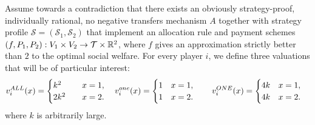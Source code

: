 Assume towards a contradiction that 
there exists an obviously strategy-proof, individually rational, no negative transfers mechanism $A$ together with strategy profile $\mathcal S=(\mathcal S_1,\mathcal S_2)$
that implement an allocation rule and payment schemes  $(f,P_1,P_2):V_1\times V_2\to \mathcal{T}\times \mathbb R^2$, where $f$ 
gives an approximation strictly better than $2$ to the optimal social welfare.  
For every player $i$, we define three valuations that will be of particular interest:  
$$
v_i^{ALL}(x)=\begin{cases}
k^2 &\quad x=1, \\
2k^2 &\quad x=2.
\end{cases} \\\quad 
v_i^{one}(x)= \begin{cases}
1 \quad x=1, \\
1 \quad x=2.
\end{cases}
 \quad
v_i^{ONE}(x)=\begin{cases}
4k \quad x= 1, \\
4k  \quad x=2.
\end{cases} 
$$
where $k$ is arbitrarily large. 


